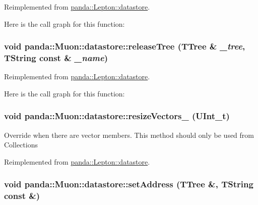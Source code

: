 Reimplemented from \hyperlink{structpanda_1_1Lepton_1_1datastore_a44602d14a45e9a23ffdb02f9dfa7e018}{panda::Lepton::datastore}.

Here is the call graph for this function:\hypertarget{structpanda_1_1Muon_1_1datastore_ac48b5f3d5fb73f9e54f0f810d11f8010}{
\subsubsection[{releaseTree}]{\setlength{\rightskip}{0pt plus 5cm}void panda::Muon::datastore::releaseTree (TTree \& {\em \_\-tree}, \/  TString const \& {\em \_\-name})}}
\label{structpanda_1_1Muon_1_1datastore_ac48b5f3d5fb73f9e54f0f810d11f8010}


Reimplemented from \hyperlink{structpanda_1_1Lepton_1_1datastore_a3288e551dbce7062e6f2e4e88f1a6a40}{panda::Lepton::datastore}.

Here is the call graph for this function:\hypertarget{structpanda_1_1Muon_1_1datastore_a77544efc70e6058bc86a09dc6a13f483}{
\subsubsection[{resizeVectors\_\-}]{\setlength{\rightskip}{0pt plus 5cm}void panda::Muon::datastore::resizeVectors\_\- (UInt\_\-t)}}
\label{structpanda_1_1Muon_1_1datastore_a77544efc70e6058bc86a09dc6a13f483}


Override when there are vector members. This method should only be used from Collections 

Reimplemented from \hyperlink{structpanda_1_1Lepton_1_1datastore_ae0167ad568d7b57d6e11b1775cd790c7}{panda::Lepton::datastore}.\hypertarget{structpanda_1_1Muon_1_1datastore_a04e66e2ffe68566cbba217d5682c8288}{
\subsubsection[{setAddress}]{\setlength{\rightskip}{0pt plus 5cm}void panda::Muon::datastore::setAddress (TTree \&, \/  TString const \&)}}
\label{structpanda_1_1Muon_1_1datastore_a04e66e2ffe68566cbba217d5682c8288}


